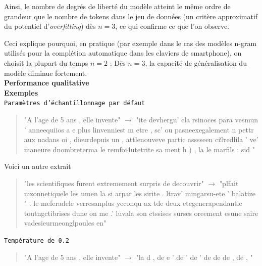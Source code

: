 Ainsi, le nombre de degrés de liberté du modèle atteint le même ordre
de grandeur que le nombre de tokens dans le jeu de données (un critère
approximatif du potentiel d'\emph{overfitting}) dès \(n=3\), ce qui
confirme ce que l'on observe.

Ceci explique pourquoi, en pratique (par exemple dans le cas des modèles
n-gram utilisés pour la complétion automatique dans les claviers de
smartphone), on choisit la plupart du temps \(n=2\) : Dès \(n=3\), la
capacité de généralisation du modèle diminue fortement. \\


\noindent{}\textbf{Performance qualitative} \\

\textbf{Exemples} \\


\noindent{} \texttt{Paramètres d'échantillonnage par défaut}

  \begin{quotation}
  "A l'age de 5 ans , elle invente" $\rightarrow$ "ite devhergu' cla rsinoces para vesmun ' anneequiios a e plus linvenniest m etre  , sc' ou pasneexegalement n pettr aux nadans oi , dieurdepuis un  , attlenouveve partic asssseen ci9redlila ' ve' maneure dnombreterma le remfoi4utetrite sa ment h ) , la le marfils : sid "
  \end{quotation}


Voici un autre extrait

  \begin{quotation}
  "les scientifiques furent extremement surpris de decouvrir" $\rightarrow$ "plfait nizonnetiquele les  umen la si arpar les sirite  . ltrav' mingarsu-ete ' balatize  " . le meferadele verresanplus yeconqu ax tde deux  etcgenerapendantle toutngctibrises dune on me  .' luvala son ctssises surses oreement esune saire vadesieurmeonglpoules en"
  \end{quotation}


\noindent{} \texttt{Température de 0.2}

  \begin{quotation}
    
    "A l'age de 5 ans , elle invente" $\rightarrow$ "la d  \hspace{0.3cm},  \hspace{0.3cm}  de   \hspace{0.3cm}  e  \hspace{3cm}                ' de   \hspace{0.6cm}  ' de \hspace{2.7cm}              ' de    \hspace{2cm}     de  \hspace{0.6cm}   de \hspace{0.6cm}   ,  \hspace{0.5cm}         de \hspace{0.3cm}     , \hspace{0.8cm}             "
  \end{quotation}



